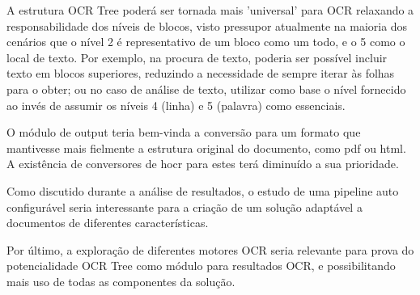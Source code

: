 A estrutura OCR Tree poderá ser tornada mais 'universal' para OCR relaxando a responsabilidade dos níveis de blocos, visto pressupor atualmente na maioria dos cenários que o nível 2 é representativo de um bloco como um todo, e o 5 como o local de texto. Por exemplo, na procura de texto, poderia ser possível incluir texto em blocos superiores, reduzindo a necessidade de sempre iterar às folhas para o obter; ou no caso de análise de texto, utilizar como base o nível fornecido ao invés de assumir os níveis 4 (linha) e 5 (palavra) como essenciais.

O módulo de output teria bem-vinda a conversão para um formato que mantivesse mais fielmente a estrutura original do documento, como pdf ou html. A existência de conversores de hocr para estes terá diminuído a sua prioridade.

Como discutido durante a análise de resultados, o estudo de uma pipeline auto configurável seria interessante para a criação de um solução adaptável a documentos de diferentes características. 


Por último, a exploração de diferentes motores OCR seria relevante para prova do potencialidade OCR Tree como módulo para resultados OCR, e possibilitando mais uso de todas as componentes da solução.


		